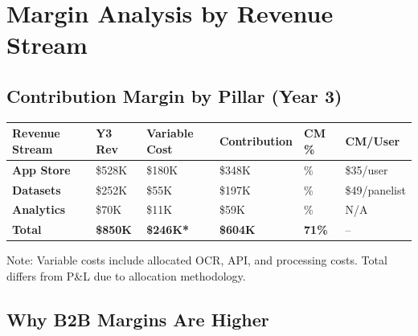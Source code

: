 \documentclass[11pt,a4paper]{article}
\begin{document}
\section*{\textcolor{miloprimary}{Margin Analysis by Revenue Stream}}

\subsection*{\textcolor{milosecondary}{Contribution Margin by Pillar (Year 3)}}

\begin{center}
\renewcommand{\arraystretch}{1.6}
\begin{tabular}{>{\raggedright\arraybackslash}p{3.5cm} >{\centering\arraybackslash}p{2cm} >{\centering\arraybackslash}p{2.2cm} >{\centering\arraybackslash}p{2.2cm} >{\centering\arraybackslash}p{2.2cm} >{\centering\arraybackslash}p{2cm}}
\toprule
\rowcolor{miloprimary!15}
\textbf{Revenue Stream} & \textbf{Y3 Rev} & \textbf{Variable Cost} & \textbf{Contribution} & \textbf{CM \%} & \textbf{CM/User} \\
\midrule
\rowcolor{appstoreblue!8}
\textcolor{appstoreblue}{\textbf{App Store}} & \$528K & \$180K & \$348K & 66\% & \$35/user \\
\rowcolor{datapurple!8}
\textcolor{datapurple}{\textbf{Datasets}} & \$252K & \$55K & \$197K & 78\% & \$49/panelist \\
\rowcolor{analyticsteal!8}
\textcolor{analyticsteal}{\textbf{Analytics}} & \$70K & \$11K & \$59K & 85\% & N/A \\
\midrule
\rowcolor{successgreen!10}
\textbf{Total} & \textbf{\$850K} & \textbf{\$246K*} & \textbf{\$604K} & \textbf{71\%} & -- \\
\bottomrule
\end{tabular}
\end{center}

\vspace{0.2cm}
{\small *Note: Variable costs include allocated OCR, API, and processing costs. Total differs from P\&L due to allocation methodology.}

\vspace{0.5cm}

\subsection*{\textcolor{milosecondary}{Why B2B Margins Are Higher}}
\end{document}
